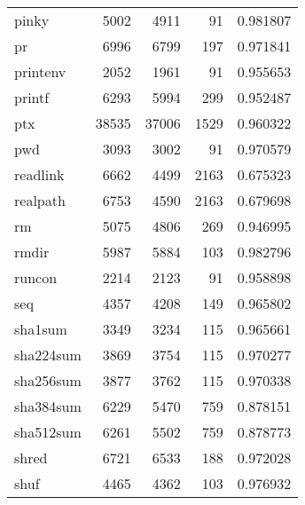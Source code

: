 \begin{tabular}{lrrrr}
pinky     &                     5002 &         4911 &            91 &                 0.981807 \\
pr        &                     6996 &         6799 &           197 &                 0.971841 \\
printenv  &                     2052 &         1961 &            91 &                 0.955653 \\
printf    &                     6293 &         5994 &           299 &                 0.952487 \\
ptx       &                    38535 &        37006 &          1529 &                 0.960322 \\
pwd       &                     3093 &         3002 &            91 &                 0.970579 \\
readlink  &                     6662 &         4499 &          2163 &                 0.675323 \\
realpath  &                     6753 &         4590 &          2163 &                 0.679698 \\
rm        &                     5075 &         4806 &           269 &                 0.946995 \\
rmdir     &                     5987 &         5884 &           103 &                 0.982796 \\
runcon    &                     2214 &         2123 &            91 &                 0.958898 \\
seq       &                     4357 &         4208 &           149 &                 0.965802 \\
sha1sum   &                     3349 &         3234 &           115 &                 0.965661 \\
sha224sum &                     3869 &         3754 &           115 &                 0.970277 \\
sha256sum &                     3877 &         3762 &           115 &                 0.970338 \\
sha384sum &                     6229 &         5470 &           759 &                 0.878151 \\
sha512sum &                     6261 &         5502 &           759 &                 0.878773 \\
shred     &                     6721 &         6533 &           188 &                 0.972028 \\
shuf      &                     4465 &         4362 &           103 &                 0.976932 \\

\end{tabular}

